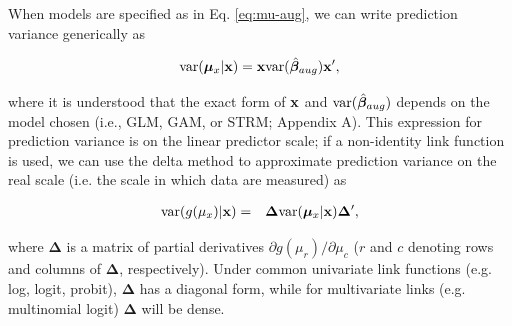 \documentclass[12pt,english]{article}
\begin{document}
\begin{spacing}{1.9}
When models are specified as in Eq. \ref{eq:mu-aug}, we can write prediction variance generically as
\begin{linenomath*}
\begin{equation}
  \label{eq:var-mu}
  {\rm var}(\boldsymbol{\mu}_x | {\bf x})= {\bf x} {\rm var}(\hat{\boldsymbol{\beta}}_{aug}) {\bf x}^\prime,
\end{equation}
\end{linenomath*}
where it is understood that the exact form of ${\bf x}$ and ${\rm var}(\hat{\boldsymbol{\beta}}_{aug})$ depends on the model chosen (i.e., GLM, GAM, or STRM; Appendix A). This expression for prediction variance is on the linear predictor scale; if a non-identity link function is used, we can use the delta method \citep{Dorfman1938,VerHoef2012} to approximate prediction variance on the real scale (i.e. the scale in which data are measured) as
\begin{linenomath*}
\begin{eqnarray*}
  \label{eq:var-mu}
  {\rm var}(g(\mu_x) | {\bf x}) & = & \boldsymbol{\Delta} {\rm var}(\boldsymbol{\mu}_x | {\bf x})\boldsymbol{\Delta}^\prime, 
\end{eqnarray*}
\end{linenomath*}
where $\boldsymbol{\Delta}$ is a matrix of partial derivatives $\partial g(\mu_r)/\partial \mu_c$ ($r$ and $c$ denoting rows and columns of $\boldsymbol{\Delta}$, respectively).  Under common univariate link functions (e.g. log, logit, probit), $\boldsymbol{\Delta}$ has a diagonal form, while for multivariate links (e.g. multinomial logit) $\boldsymbol{\Delta}$ will be dense.


\end{spacing}
\end{document}
